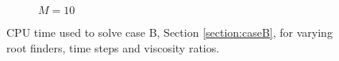 \begin{figure}[!ht]
\begin{subfigure}[b]{0.49\textwidth}
%
\caption{$M =10$} \label{fig:spe10_cputime_perm_i_0_0_0_m_10_1_i_50_dt_40to150}
\end{subfigure}%
\caption{CPU time used to solve case B, Section \ref{section:caseB}, for varying root finders, time steps and viscosity ratios.}
\label{fig:spe10_cputime_perm_i_0_0_0_i_50}
\end{figure}%
%
